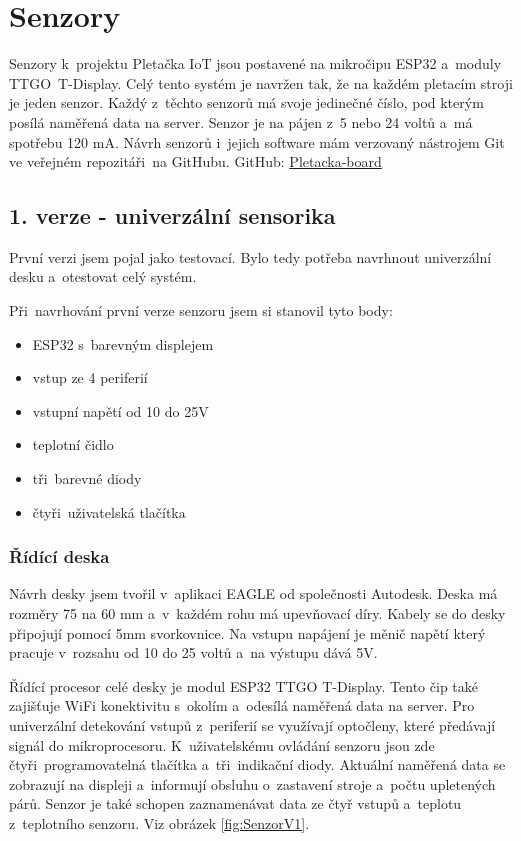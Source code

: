 \chapter{Senzory}

Senzory k~projektu Pletačka IoT jsou postavené na mikročipu ESP32 a~moduly TTGO~T-Display.
Celý tento systém je navržen tak, že na každém pletacím stroji je jeden senzor.
Každý z~těchto senzorů má svoje jedinečné číslo, pod kterým posílá naměřená data na server.
Senzor je na pájen z~5 nebo 24 voltů a~má spotřebu 120 mA.
Návrh senzorů i~jejich software mám verzovaný nástrojem Git ve veřejném repozitáři~na GitHubu.\newline
GitHub: \href{https://github.com/Pletacka-IoT/Pletacka-board}{Pletacka-board}\cite{PL_BOARD}

\section{1. verze - univerzální sensorika}

První verzi jsem pojal jako testovací. Bylo tedy potřeba navrhnout univerzální desku a~otestovat celý systém.\newline

Při~navrhování první verze senzoru jsem si stanovil tyto body:
\begin{itemize}
    \item ESP32 s~barevným displejem
    \item vstup ze 4 periferií
    \item vstupní napětí od 10 do 25V
    \item teplotní čidlo
    \item tři~barevné diody
    \item čtyři~uživatelská tlačítka
\end{itemize}


\subsection{Řídící deska}
Návrh desky jsem tvořil v~aplikaci EAGLE od společnosti Autodesk. 
Deska má rozměry 75 na 60 mm a~v~každém rohu má upevňovací díry. 
Kabely se do desky připojují pomocí 5mm svorkovnice.
Na vstupu napájení je měnič napětí který pracuje v~rozsahu od 10 do 25 voltů a~na výstupu dává 5V. 

Řídící procesor celé desky je modul ESP32 TTGO T-Display.
Tento čip také zajišťuje WiFi konektivitu s~okolím a~odesílá naměřená data na server.
Pro univerzální detekování vstupů z~periferií se využívají optočleny, které předávají signál do mikroprocesoru.
K~uživatelskému ovládání senzoru jsou zde čtyři~programovatelná tlačítka a~tři~indikační diody.
Aktuální naměřená data se zobrazují na displeji a~informují obsluhu o~zastavení stroje a~počtu upletených párů.
Senzor je také schopen zaznamenávat data ze čtyř vstupů a~teplotu z~teplotního senzoru. Viz obrázek \ref{fig:SenzorV1}.

